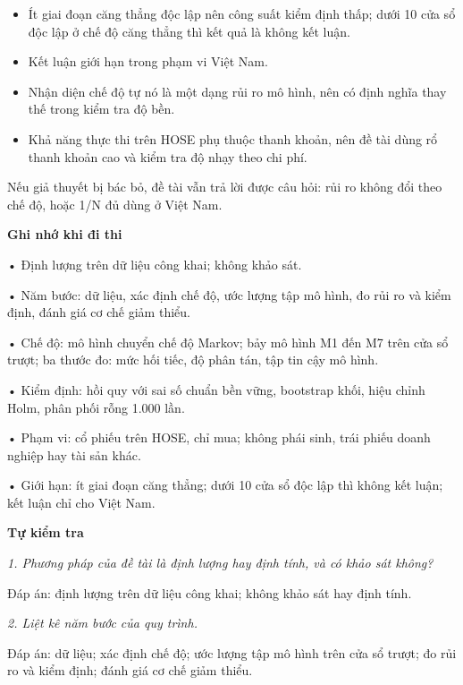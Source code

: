 \begin{itemize}
\item
  Ít giai đoạn căng thẳng độc lập nên công suất kiểm định thấp; dưới 10 cửa sổ độc lập ở chế độ căng thẳng thì kết quả là không kết luận.
\item
  Kết luận giới hạn trong phạm vi Việt Nam.
\item
  Nhận diện chế độ tự nó là một dạng rủi ro mô hình, nên có định nghĩa thay thế trong kiểm tra độ bền.
\item
  Khả năng thực thi trên HOSE phụ thuộc thanh khoản, nên đề tài dùng rổ thanh khoản cao và kiểm tra độ nhạy theo chi phí.
\end{itemize}

Nếu giả thuyết bị bác bỏ, đề tài vẫn trả lời được câu hỏi: rủi ro không đổi theo chế độ, hoặc 1/N đủ dùng ở Việt Nam.

\begin{tcolorbox}[breakable]
\textbf{Ghi nhớ khi đi thi}

• Định lượng trên dữ liệu công khai; không khảo sát.

• Năm bước: dữ liệu, xác định chế độ, ước lượng tập mô hình, đo rủi ro và kiểm định, đánh giá cơ chế giảm thiểu.

• Chế độ: mô hình chuyển chế độ Markov; bảy mô hình M1 đến M7 trên cửa sổ trượt; ba thước đo: mức hối tiếc, độ phân tán, tập tin cậy mô hình.

• Kiểm định: hồi quy với sai số chuẩn bền vững, bootstrap khối, hiệu chỉnh Holm, phân phối rỗng 1.000 lần.

• Phạm vi: cổ phiếu trên HOSE, chỉ mua; không phái sinh, trái phiếu doanh nghiệp hay tài sản khác.

• Giới hạn: ít giai đoạn căng thẳng; dưới 10 cửa sổ độc lập thì không kết luận; kết luận chỉ cho Việt Nam.
\end{tcolorbox}

\textbf{Tự kiểm tra}

{\itshape 1. Phương pháp của đề tài là định lượng hay định tính, và có khảo sát không?\par}

Đáp án: định lượng trên dữ liệu công khai; không khảo sát hay định tính.

{\itshape 2. Liệt kê năm bước của quy trình.\par}

Đáp án: dữ liệu; xác định chế độ; ước lượng tập mô hình trên cửa sổ trượt; đo rủi ro và kiểm định; đánh giá cơ chế giảm thiểu.

